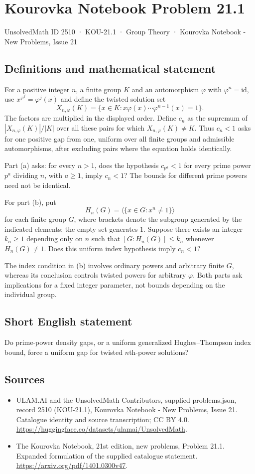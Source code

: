 \documentclass[11pt,a4paper]{article}
\begin{document}
\section*{Kourovka Notebook Problem 21.1}\label{2510}
{\small UnsolvedMath ID 2510 · KOU-21.1 · Group Theory · Kourovka Notebook - New Problems, Issue 21}
\subsection{Definitions and mathematical statement}
For a positive integer $n$, a finite group $K$ and an automorphism
$\varphi$ with $\varphi^n=\mathrm{id}$, use $x^{\varphi^j}=\varphi^j(x)$
and define the twisted solution set
\[
 X_{n,\varphi}(K)=\{x\in K:x\varphi(x)\cdots\varphi^{n-1}(x)=1\}.
\]
The factors are multiplied in the displayed order. Define $c_n$ as the
supremum of $|X_{n,\varphi}(K)|/|K|$ over all these pairs for which
$X_{n,\varphi}(K)\ne K$. Thus $c_n<1$ asks for one positive gap from
one, uniform over all finite groups and admissible automorphisms, after
excluding pairs where the equation holds identically.

Part (a) asks: for every $n>1$, does the hypothesis $c_{p^a}<1$ for
every prime power $p^a$ dividing $n$, with $a\ge1$, imply $c_n<1$?
The bounds for different prime powers need not be identical.

For part (b), put
\[
 H_n(G)=\langle\{x\in G:x^n\ne1\}\rangle
\]
for each finite group $G$, where brackets denote the subgroup generated
by the indicated elements; the empty set generates $1$.
Suppose there exists an integer $k_n\ge1$ depending only on $n$ such
that $[G:H_n(G)]\le k_n$ whenever $H_n(G)\ne1$.
Does this uniform index hypothesis imply $c_n<1$?

The index condition in (b) involves ordinary powers and arbitrary finite
$G$, whereas its conclusion controls twisted powers for arbitrary
$\varphi$. Both parts ask implications for a fixed integer parameter,
not bounds depending on the individual group.
\subsection{Short English statement}
Do prime-power density gaps, or a uniform generalized Hughes–Thompson index bound, force a uniform gap for twisted $n$th-power solutions?
\subsection{Sources}
\begin{itemize}
\item[S1] ULAM.AI and the UnsolvedMath Contributors, supplied problems.json, record 2510 (KOU-21.1), Kourovka Notebook - New Problems, Issue 21. Catalogue identity and source transcription; CC BY 4.0.
\url{https://huggingface.co/datasets/ulamai/UnsolvedMath}.
\item[S2] The Kourovka Notebook, 21st edition, new problems, Problem 21.1. Expanded formulation of the supplied catalogue statement.
\url{https://arxiv.org/pdf/1401.0300v47}.
\end{itemize}
\end{document}
